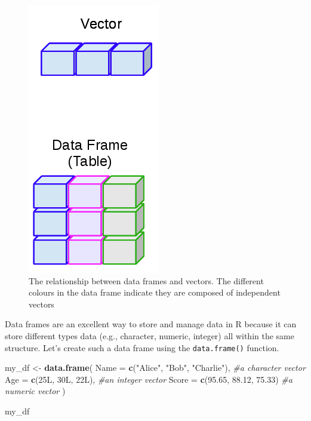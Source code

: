 \documentclass[
]{book}
\newenvironment{Shaded}{\begin{snugshade}}{\end{snugshade}}
\newcommand{\AttributeTok}[1]{\textcolor[rgb]{0.13,0.29,0.53}{#1}}
\newcommand{\CommentTok}[1]{\textcolor[rgb]{0.56,0.35,0.01}{\textit{#1}}}
\newcommand{\FloatTok}[1]{\textcolor[rgb]{0.00,0.00,0.81}{#1}}
\newcommand{\FunctionTok}[1]{\textcolor[rgb]{0.13,0.29,0.53}{\textbf{#1}}}
\newcommand{\NormalTok}[1]{#1}
\newcommand{\OtherTok}[1]{\textcolor[rgb]{0.56,0.35,0.01}{#1}}
\newcommand{\StringTok}[1]{\textcolor[rgb]{0.31,0.60,0.02}{#1}}
\begin{document}
\begin{figure}
\centering
\includegraphics{img/03-dataframes_vectors.png}
\caption{\label{fig:unnamed-chunk-65}The relationship between data frames and vectors. The different colours in the data frame indicate they are composed of independent vectors}
\end{figure}

Data frames are an excellent way to store and manage data in R because it can store different types data (e.g., character, numeric, integer) all within the same structure. Let's create such a data frame using the \texttt{data.frame()} function.

\begin{Shaded}
\begin{Highlighting}[]
\NormalTok{my\_df }\OtherTok{\textless{}{-}} \FunctionTok{data.frame}\NormalTok{(}
  \AttributeTok{Name =} \FunctionTok{c}\NormalTok{(}\StringTok{"Alice"}\NormalTok{, }\StringTok{"Bob"}\NormalTok{, }\StringTok{"Charlie"}\NormalTok{), }\CommentTok{\#a character vector}
  \AttributeTok{Age =} \FunctionTok{c}\NormalTok{(25L, 30L, 22L), }\CommentTok{\#an integer vector}
  \AttributeTok{Score =} \FunctionTok{c}\NormalTok{(}\FloatTok{95.65}\NormalTok{, }\FloatTok{88.12}\NormalTok{, }\FloatTok{75.33}\NormalTok{) }\CommentTok{\#a numeric vector}
\NormalTok{)}

\NormalTok{my\_df}
\end{Highlighting}
\end{Shaded}
\end{document}
